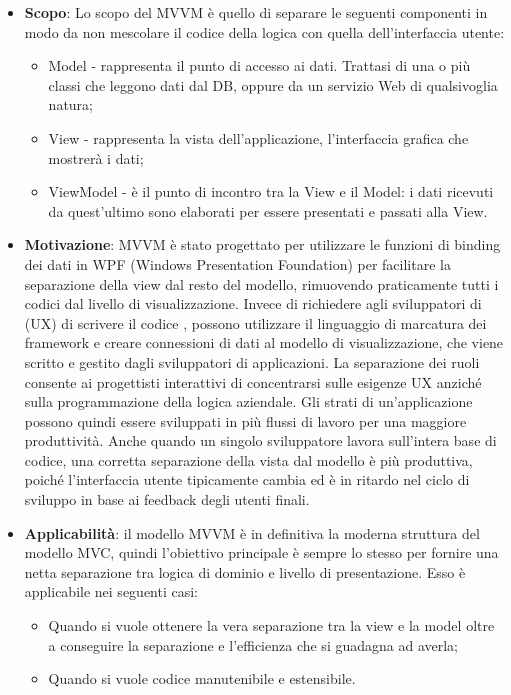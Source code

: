 		\begin{itemize}
		\item \textbf{Scopo}: Lo scopo del MVVM è quello di separare le seguenti componenti in modo da non mescolare il codice della logica con quella dell'interfaccia utente:
		\begin{itemize}
		\item Model - rappresenta il punto di accesso ai dati. Trattasi di una o più classi che leggono dati dal DB, oppure da un servizio Web di qualsivoglia natura;
		\item View - rappresenta la vista dell’applicazione, l’interfaccia grafica che mostrerà i dati;
		\item ViewModel - è il punto di incontro tra la View e il Model: i dati ricevuti da quest’ultimo sono elaborati per essere presentati e passati alla View.
		\end{itemize}

		\item \textbf{Motivazione}: MVVM è stato progettato per utilizzare le funzioni di binding dei dati in WPF (Windows Presentation Foundation) per facilitare la separazione della view dal resto del modello, rimuovendo praticamente tutti i codici  dal livello di visualizzazione. Invece di richiedere agli sviluppatori di  (UX) di scrivere il codice , possono utilizzare il linguaggio di marcatura dei framework e creare connessioni di dati al modello di visualizzazione, che viene scritto e gestito dagli sviluppatori di applicazioni. La separazione dei ruoli consente ai progettisti interattivi di concentrarsi sulle esigenze UX anziché sulla programmazione della logica aziendale. Gli strati di un'applicazione possono quindi essere sviluppati in più flussi di lavoro per una maggiore produttività. Anche quando un singolo sviluppatore lavora sull'intera base di codice, una corretta separazione della vista dal modello è più produttiva, poiché l'interfaccia utente tipicamente cambia ed è in ritardo nel ciclo di sviluppo in base ai feedback degli utenti finali. 
\item \textbf{Applicabilità}: il modello MVVM è in definitiva la moderna struttura del modello MVC, quindi l'obiettivo principale è sempre lo stesso per fornire una netta separazione tra logica di dominio e livello di presentazione. Esso è applicabile nei seguenti casi:
\begin{itemize}
\item Quando si vuole ottenere la vera separazione tra la view e la model oltre a conseguire la separazione e l'efficienza che si guadagna ad averla;
\item Quando si vuole codice manutenibile e estensibile. 
\end{itemize}
		\end{itemize}
	
